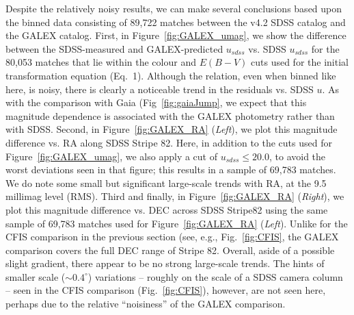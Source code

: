 \documentclass[fleqn,usenatbib]{mnras}
\begin{document}
Despite the relatively noisy results, we can make several conclusions
based upon the binned data consisting of 89,722 matches between the
v4.2 SDSS catalog and the GALEX catalog.  First, in
Figure~\ref{fig:GALEX_umag}, we show the difference between the
SDSS-measured and GALEX-predicted $u_{sdss}$ vs. SDSS $u_{sdss}$ for
the 80,053 matches that lie within the colour and $E(B-V)$ cuts used
for the initial transformation equation (Eq.~1).  Although the
relation, even when binned like here, is noisy, there is clearly a
noticeable trend in the residuals vs. SDSS $u$.  As with the
comparison with Gaia (Fig~\ref{fig:gaiaJump}, we expect that this
magnitude dependence is associated with the GALEX photometry rather
than with SDSS.  Second, in Figure~\ref{fig:GALEX_RA} ({\it Left}), we plot this
magnitude difference vs. RA along SDSS Stripe 82.  Here, in addition
to the cuts used for Figure~\ref{fig:GALEX_umag}, we also apply a cut
of $u_{sdss}\le20.0$, to avoid the worst deviations seen in that
figure; this results in a sample of 69,783 matches.  We do note some
small but significant large-scale trends with RA, at the 9.5 millimag
level (RMS).  
Third and finally, in Figure~\ref{fig:GALEX_RA} ({\it Right}), we plot this
magnitude difference vs. DEC across SDSS Stripe82 using the same
sample of 69,783 matches used for Figure~\ref{fig:GALEX_RA} ({\it Left}).  Unlike
for the CFIS comparison in the previous section (see, e.g.,
Fig.~\ref{fig:CFIS}, the GALEX comparison covers the full DEC range of
Stripe 82.  Overall, aside of a possible slight gradient, there appear
to be no strong large-scale trends.  The hints of smaller scale
($\sim0.4^{\circ}$) variations -- roughly on the scale of a SDSS
camera column -- seen in the CFIS comparison (Fig.~\ref{fig:CFIS}),
however, are not seen here, perhaps due to the relative ``noisiness''
of the GALEX comparison.
\end{document}
